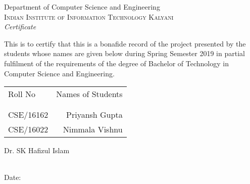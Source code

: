 \newpage
\thispagestyle{empty}

\begin{center}

\huge{Department of Computer Science and Engineering}\\[0.5cm]
\normalsize
\textsc{Indian Institute of Information Technology Kalyani}\\[2.0cm]

\emph{\LARGE Certificate}\\[2.5cm]
\end{center}
\normalsize This is to certify that this is a bonafide record of the project presented by the students whose names are given below during Spring Semester 2019 in partial fulfilment of the requirements of the degree of Bachelor of Technology in Computer Science and Engineering.\\[1.0cm]

\begin{table}[h]
\centering
\begin{tabular}{lr}
Roll No & Names of Students \\ \\ \hline
\\
CSE/16162 & Priyansh Gupta \\ 
CSE/16022 & Nimmala Vishnu \\

\end{tabular}
\end{table}

\vfill


\begin{flushright}
Dr. SK Hafizul Islam\\
\\[1.5cm]
\end{flushright}

\begin{flushleft}
Date: 
\end{flushleft}
